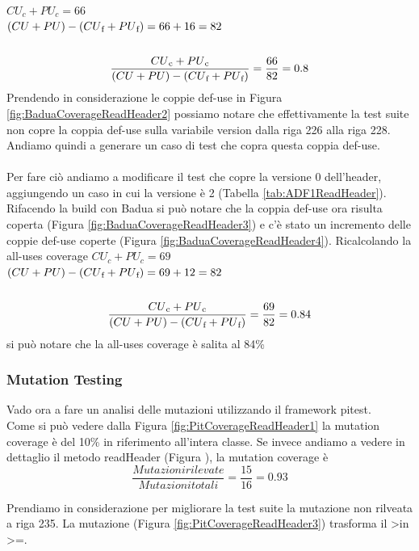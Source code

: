 \documentclass[10pt, a4paper]{article}
\begin{document}
\(CU_c + PU_c = 66\) \\
\( (CU + PU) - (CU\textsubscript{f} + PU\textsubscript{f}) = 66 + 16 = 82\) \\ \\
\[\frac{{CU\textsubscript{c} + PU\textsubscript{c}}}{{(CU + PU) - (CU\textsubscript{f} + PU\textsubscript{f})}} = \frac{{66}}{{82}} = 0.8\]
Prendendo in considerazione le coppie def-use in Figura \ref{fig:BaduaCoverageReadHeader2} possiamo notare che
effettivamente la test suite non copre la coppia def-use sulla variabile version dalla riga 226 alla riga 228.
Andiamo quindi a generare un caso di test che copra questa coppia def-use. \\ \\
Per fare ciò andiamo a modificare il test che copre la versione 0 dell'header, aggiungendo un caso in cui la versione
è 2 (Tabella \ref{tab:ADF1ReadHeader}).  Rifacendo la build con Badua si può notare che la coppia def-use ora risulta coperta (Figura \ref{fig:BaduaCoverageReadHeader3})
e c'è stato un incremento delle coppie def-use coperte (Figura \ref{fig:BaduaCoverageReadHeader4}). Ricalcolando
la all-uses coverage 
\(CU_c + PU_c = 69\) \\
\( (CU + PU) - (CU\textsubscript{f} + PU\textsubscript{f}) = 69 + 12 = 82\) \\ \\
\[\frac{{CU\textsubscript{c} + PU\textsubscript{c}}}{{(CU + PU) - (CU\textsubscript{f} + PU\textsubscript{f})}} = \frac{{69}}{{82}} = 0.84\]
si può notare che la all-uses coverage è salita al 84\% \\

\subsubsection{Mutation Testing}
Vado ora a fare un analisi delle mutazioni utilizzando il framework pitest. \\
Come si può vedere dalla Figura \ref{fig:PitCoverageReadHeader1} la mutation coverage è del 10\% in riferimento all'intera classe.
Se invece andiamo a vedere in dettaglio il metodo readHeader (Figura ), la mutation coverage è 
\[\frac{{Mutazioni rilevate}}{{Mutazioni totali}} = \frac{{15}}{{16}} = 0.93\]



Prendiamo in considerazione per migliorare la test suite la mutazione non rilveata a riga 235. 
La mutazione (Figura \ref{fig:PitCoverageReadHeader3}) trasforma il \textgreater in \textgreater=.
\end{document}
